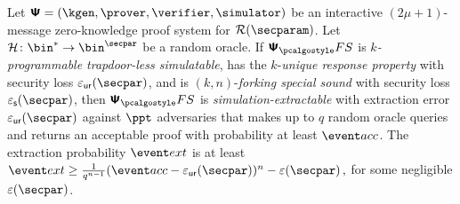 \begin{theorem}
  \label{thm:se}
  Let $\ps = (\kgen, \prover, \verifier, \simulator)$ be an interactive $(2 \mu + 1)$-message
  zero-knowledge proof system for $\RELGEN(\secparam)$. Let $\ro\colon \bin^{*} \to \bin^{\secpar}$ be a random oracle. If $\psfs$ is \emph{$k$-programmable trapdoor-less simulatable}, has
the $k$-\emph{unique response property} with security loss $\epsur(\secpar)$, and is $(k, n)$-\emph{forking special
  sound} with security loss $\epss(\secpar)$, then $\psfs$ is \emph{simulation-extractable} with extraction error $\epsur(\secpar)$ against $\ppt$
  adversaries that makes up to $q$ random oracle queries and returns an acceptable
  proof with probability at least $\accProb$.  The extraction probability $\extProb$ is at
  least
  \( \extProb \geq \frac{1}{q^{n - 1}} (\accProb - \epsur(\secpar))^{n} -\eps(\secpar)\,, \)
  for some negligible $\eps(\secpar)$.
\end{theorem}
